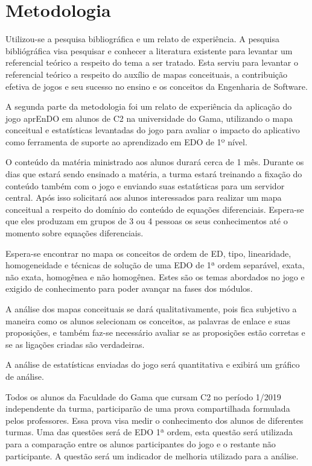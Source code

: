 \chapter[Metodologia]{Metodologia}
Utilizou-se a pesquisa bibliográfica e um relato de experiência. A pesquisa bibliógráfica visa pesquisar e conhecer a literatura existente para levantar um referencial teórico a respeito do tema a ser tratado. Esta serviu para levantar o referencial teórico a respeito do auxílio de mapas conceituais, a contribuição efetiva de jogos e seu sucesso no ensino e os conceitos da Engenharia de Software.

A segunda parte da metodologia foi um relato de experiência da aplicação do jogo aprEnDO em alunos de C2 na universidade do Gama, utilizando o mapa conceitual e estatísticas levantadas do jogo para avaliar o impacto do aplicativo como ferramenta de suporte ao aprendizado em EDO de 1º nível.

O conteúdo da matéria ministrado aos alunos durará cerca de 1 mês. Durante os dias que estará sendo ensinado a matéria, a turma estará treinando a fixação do conteúdo também com o jogo e enviando suas estatísticas para um servidor central. Após isso solicitará aos alunos interessados para realizar um mapa conceitual a respeito do domínio do conteúdo de equações diferenciais. Espera-se que eles produzam em grupos de 3 ou 4 pessoas os seus conhecimentos até o momento sobre equações diferenciais. 

Espera-se encontrar no mapa os conceitos de ordem de ED, tipo, linearidade, homogeneidade e técnicas de solução de uma EDO de 1ª ordem separável, exata, não exata, homogênea e não homogênea. Estes são os temas abordados no jogo e exigido de conhecimento para poder avançar na fases dos módulos.

A análise dos mapas conceituais se dará qualitativamente, pois fica subjetivo a maneira como os alunos selecionam os conceitos, as palavras de enlace e suas proposições, e também faz-se necessário avaliar se as proposições estão corretas e se as ligações criadas são verdadeiras.

A análise de estatísticas enviadas do jogo será quantitativa e exibirá um gráfico de análise. 

Todos os alunos da Faculdade do Gama que cursam C2 no período 1/2019 independente da turma, participarão de uma prova compartilhada formulada pelos professores. Essa prova visa medir o conhecimento dos alunos de diferentes turmas. Uma das questões será de EDO 1ª ordem, esta questão será utilizada para a comparação entre os alunos participantes do jogo e o restante não participante. A questão será um indicador de melhoria utilizado para a análise.

